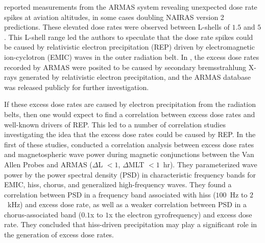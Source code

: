 \documentclass[draft]{agujournal2019}
\begin{document}
 reported measurements from the ARMAS system revealing unexpected dose rate spikes at aviation altitudes, in some cases doubling NAIRAS version 2 predictions. These elevated dose rates were observed between L-shells of $1.5$ and $5$. This L-shell range led the authors to speculate that the dose rate spikes could be caused by relativistic electron precipitation (REP) driven by electromagnetic ion-cyclotron (EMIC) waves in the outer radiation belt.
In , the excess dose rates recorded by ARMAS were posited to be caused by secondary bremsstrahlung X-rays generated by relativistic electron precipitation, and the ARMAS database was released publicly for further investigation.

If these excess dose rates are caused by electron precipitation from the radiation belts, then one would expect to find a correlation between excess dose rates and well-known drivers of REP. This led to a number of correlation studies investigating the idea that the excess dose rates could be caused by REP. In the first of these studies,  conducted a correlation analysis between excess dose rates and magnetospheric wave power during magnetic conjunctions between the Van Allen Probes and ARMAS ($\Delta$L $< 1$, $\Delta$MLT $< 1$~hr). They parameterized wave power by the power spectral density (PSD) in characteristic frequency bands for EMIC, hiss, chorus, and generalized high-frequency waves. They found a correlation between PSD in a frequency band associated with hiss ($100$~Hz to $2$~kHz) and excess dose rate, as well as a weaker correlation between PSD in a chorus-associated band ($0.1$x to $1$x the electron gyrofrequency) and excess dose rate. They concluded that hiss-driven precipitation may play a significant role in the generation of excess dose rates.
\end{document}

